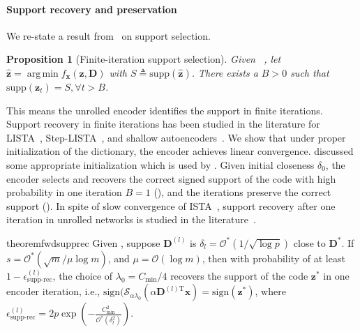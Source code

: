 \documentclass[10pt]{article} %
\newtheorem{proposition}{Proposition}[section]
\newcommand{\D}{{\bm D}}
\newcommand{\x}{{\bm x}}
\newcommand{\z}{{\bm z}}
\DeclareMathOperator*{\argmin}{arg\,min}
\begin{document}
\paragraph{Support recovery and preservation} We re-state a result from~\citep{hale2007fixed} on support selection.
%
\begin{proposition}[Finite-iteration support selection]\label{prop:supp}
Given ~, let $\hat \z = \argmin f_{\x}(\z, \D)$ with $S \triangleq \text{supp}(\hat \z)$. There exists a $B>0$ such that $ \text{supp}(\z_t) = S, \forall t > B$.
\end{proposition}
%
This means the unrolled encoder identifies the support in finite iterations. Support recovery in finite iterations has been studied in the literature for LISTA~\citep{chen2018unfoldista}, Step-LISTA~\citep{ablin2019stepsize}, and shallow autoencoders~\citep{arora2015sparsecoding, rangamani2018sparseae, nguyen2019dynamics, tolooshams2020icml}. We show that under proper initialization of the dictionary, the encoder achieves linear convergence. \citet{arora2015sparsecoding} discussed some appropriate initialization which is used by \citet{rambhatla2018noodl}. Given initial closeness $\delta_0$, the encoder selects and recovers the correct signed support of the code with high probability in one iteration $B=1$ (), and the iterations preserve the correct support (). In spite of slow convergence of ISTA~\cite{liang2014local}, support recovery after one iteration in unrolled networks is studied in the literature~\citep{arora2015sparsecoding,rambhatla2018noodl,chen2018unfoldista,nguyen2019dynamics}.
%
\begin{restatable}{theorem}{fwdsupprec}\label{thm:supprec}
Given , suppose $\D^{(l)}$ is $\delta_l = \mathcal{O}^{\ast}(1 / \sqrt{\log{p}})$ close to $\D^{\ast}$. If $s = \mathcal{O}^{\ast}(\sqrt{m} / \mu \log{m})$, and $\mu = \mathcal{O}(\log{m})$, then with probability of at least $1 - \epsilon^{(l)}_{\text{supp-rec}}$, the choice of $\lambda_0 = C_{\min} / 4$ recovers the support of the code $\z^{\ast}$ in one encoder iteration, i.e., $\text{sign}(\mathcal{S}_{\alpha \lambda_0}(\alpha \D^{(l)\text{T}} \x) = \text{sign}(\z^{\ast})$, where $\epsilon^{(l)}_{\text{supp-rec}} = 2 p\exp{(- \frac{C_{\min}^2}{\mathcal{O}^{\ast}(\delta_l^2)})}$.
\end{restatable}
%
%
\end{document}
